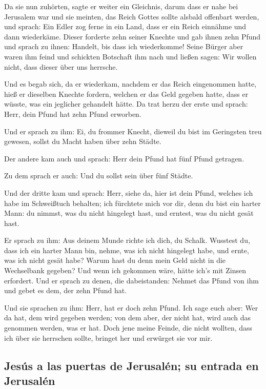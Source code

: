  Da sie nun zuhörten, sagte er weiter ein Gleichnis,
darum dass er nahe bei Jerusalem war und sie meinten, das Reich Gottes
sollte alsbald offenbart werden,  und sprach: Ein Edler
zog ferne in ein Land, dass er ein Reich einnähme und dann wiederkäme.
 Dieser forderte zehn seiner Knechte und gab ihnen zehn
Pfund und sprach zu ihnen: Handelt, bis dass ich wiederkomme!
 Seine Bürger aber waren ihm feind und schickten
Botschaft ihm nach und ließen sagen: Wir wollen nicht, dass dieser über
uns herrsche.

 Und es begab sich, da er wiederkam, nachdem er das Reich
eingenommen hatte, hieß er dieselben Knechte fordern, welchen er das
Geld gegeben hatte, dass er wüsste, was ein jeglicher gehandelt hätte.
 Da trat herzu der erste und sprach: Herr, dein Pfund hat
zehn Pfund erworben.

 Und er sprach zu ihm: Ei, du frommer Knecht, dieweil du
bist im Geringsten treu gewesen, sollst du Macht haben über zehn Städte.

 Der andere kam auch und sprach: Herr dein Pfund hat fünf
Pfund getragen.

 Zu dem sprach er auch: Und du sollst sein über fünf
Städte.

 Und der dritte kam und sprach: Herr, siehe da, hier ist
dein Pfund, welches ich habe im Schweißtuch behalten; 
ich fürchtete mich vor dir, denn du bist ein harter Mann: du nimmst, was
du nicht hingelegt hast, und erntest, was du nicht gesät hast.

 Er sprach zu ihm: Aus deinem Munde richte ich dich, du
Schalk. Wusstest du, dass ich ein harter Mann bin, nehme, was ich nicht
hingelegt habe, und ernte, was ich nicht gesät habe? 
Warum hast du denn mein Geld nicht in die Wechselbank gegeben? Und wenn
ich gekommen wäre, hätte ich's mit Zinsen erfordert.  Und
er sprach zu denen, die dabeistanden: Nehmet das Pfund von ihm und gebet
es dem, der zehn Pfund hat.

 Und sie sprachen zu ihm: Herr, hat er doch zehn Pfund.
 Ich sage euch aber: Wer da hat, dem wird gegeben werden;
von dem aber, der nicht hat, wird auch das genommen werden, was er hat.
 Doch jene meine Feinde, die nicht wollten, dass ich über
sie herrschen sollte, bringet her und erwürget sie vor mir.

\hypertarget{jesuxfas-a-las-puertas-de-jerusaluxe9n-su-entrada-en-jerusaluxe9n}{%
\subsection{Jesús a las puertas de Jerusalén; su entrada en
Jerusalén}\label{jesuxfas-a-las-puertas-de-jerusaluxe9n-su-entrada-en-jerusaluxe9n}}

